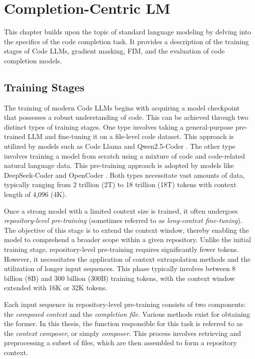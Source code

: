 \chapter{Completion-Centric LM}\label{chap:completion-centric-lm}

This chapter builds upon the topic of standard language modeling by delving into the specifics of the code completion task. It provides a description of the training stages of Code LLMs, gradient masking, FIM, and the evaluation of code completion models.  

\section{Training Stages}\label{sec:training-stages}

The training of modern Code LLMs begins with acquiring a model checkpoint that possesses a robust understanding of code. This can be achieved through two distinct types of training stages. One type involves taking a general-purpose pre-trained LLM and fine-tuning it on a file-level code dataset. This approach is utilized by models such as Code Llama \parencite{rozière2023} and Qwen2.5-Coder \parencite{hui2024}. The other type involves training a model from scratch using a mixture of code and code-related natural language data. This pre-training approach is adopted by models like DeepSeek-Coder \parencite{guo2024} and OpenCoder \parencite{huang2024}. Both types necessitate vast amounts of data, typically ranging from 2 trillion (2T) to 18 trillion (18T) tokens with context length of 4,096 (4K). 

Once a strong model with a limited context size is trained, it often undergoes \textit{repository-level pre-training} (sometimes referred to as \textit{long-context fine-tuning}). The objective of this stage is to extend the context window, thereby enabling the model to comprehend a broader scope within a given repository. Unlike the initial training stage, repository-level pre-training requires significantly fewer tokens. However, it necessitates the application of context extrapolation methods and the utilization of longer input sequences. This phase typically involves between 8 billion (8B) and 300 billion (300B) training tokens, with the context window extended with 16K or 32K tokens.

Each input sequence in repository-level pre-training consists of two components: the \textit{composed context} and the \textit{completion file}. Various methods exist for obtaining the former. In this thesis, the function responsible for this task is referred to as the \textit{context composer}, or simply \textit{composer}. This process involves retrieving and preprocessing a subset of files, which are then assembled to form a repository context.

